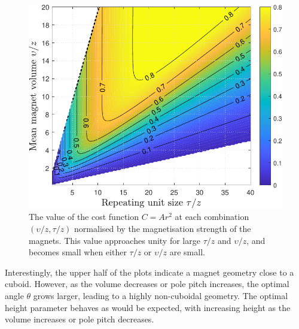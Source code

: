 \begin{figure}
	\centering
	\includegraphics[width=0.8\linewidth]{p3/p3FIG15}
	\caption{The value of the cost function \(C = Ar^2\) at each combination \(\left( \upsilon/z, \tau/z \right)\) normalised by the magnetisation strength of the magnets. This value approaches unity for large \(\tau/z\) and \(\upsilon/z\), and becomes small when either \(\tau/z\) or \(\upsilon/z\) are small.}
	\label{fig:p3generalPlanarHalbachQuality}
\end{figure}

Interestingly, the upper half of the plots indicate a magnet geometry close to a cuboid. However, as the volume decreases or pole pitch increases, the optimal angle \(\theta\) grows larger, leading to a highly non-cuboidal geometry. The optimal height parameter behaves as would be expected, with increasing height as the volume increases or pole pitch decreases.

